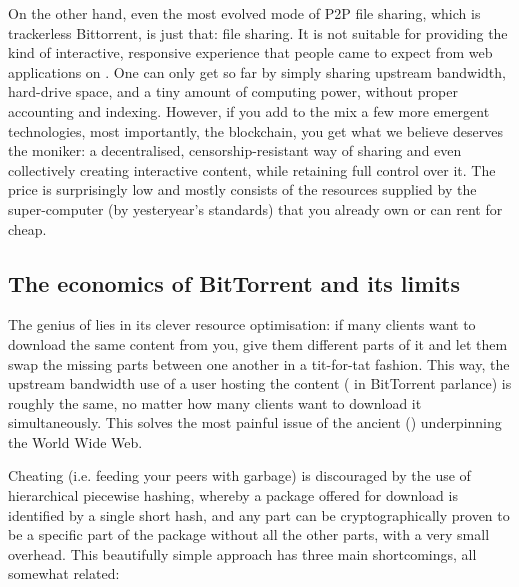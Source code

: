 On the other hand, even the most evolved mode of P2P file sharing, which is trackerless Bittorrent, is just that: file sharing. It is not suitable for providing the kind of interactive, responsive experience that people came to expect from web applications on . One can only get so far by simply sharing upstream bandwidth, hard-drive space, and a tiny amount of computing power, without proper accounting and indexing. However, if you add to the mix a few more emergent technologies, most importantly, the blockchain, you get what we believe deserves the  moniker: a decentralised, censorship-resistant way of sharing and even collectively creating interactive content, while retaining full control over it. The price is surprisingly low and mostly consists of the resources supplied by the super-computer (by yesteryear's standards) that you already own or can rent for cheap.

\subsection{The economics of BitTorrent and its limits}

The genius of  lies in its clever resource optimisation: if many clients want to download the same content from you, give them different parts of it and let them swap the missing parts between one another in a tit-for-tat fashion. This way, the upstream bandwidth use of a user hosting the content ( in BitTorrent parlance) is roughly the same, no matter how many clients want to download it simultaneously. This solves the most painful issue of the ancient  () underpinning the World Wide Web.

Cheating (i.e. feeding your peers with garbage) is discouraged by the use of hierarchical piecewise hashing, whereby a package offered for download is identified by a single short hash, and any part can be cryptographically proven to be a specific part of the package without all the other parts, with a very small overhead. This beautifully simple approach has three main shortcomings, all somewhat related:

